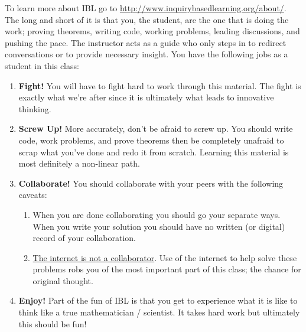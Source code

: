 To learn more about IBL go to
\href{http://www.inquirybasedlearning.org/about/}{http://www.inquirybasedlearning.org/about/}.
The long and short of it is that you, the student, are the one that is doing the
work; proving theorems, writing code, working problems, leading discussions, and pushing
the pace. The instructor acts as a guide who only steps in to redirect conversations or to
provide necessary insight. You have the following jobs as a student in this class:
\begin{enumerate}
    \item {\bf Fight!}  You will have to fight hard to work through this material.  The fight is
        exactly what we're after since it is ultimately what leads to innovative thinking.
    \item {\bf Screw Up!}  More accurately, don't be afraid to screw up.  You should write code,
    work problems, and prove theorems then be completely unafraid to scrap what you've
    done and redo it from scratch.  Learning this material is most definitely a non-linear
    path.
\item {\bf Collaborate!}  You should collaborate with your peers with the following caveats:
    \begin{enumerate}
        \item When you are done collaborating you should go your separate ways.  When you
            write your solution you should have no written (or digital) record of your
            collaboration.  
        \item \underline{The internet is not a collaborator}.  Use of the internet to help
            solve these problems robs you of the most important part of this class; the
            chance for original thought.
    \end{enumerate}
\item {\bf Enjoy!}  Part of the fun of IBL is that you get to experience what it is like to
        think like a true mathematician / scientist.  It takes hard work but ultimately
        this should be fun!
\end{enumerate}

